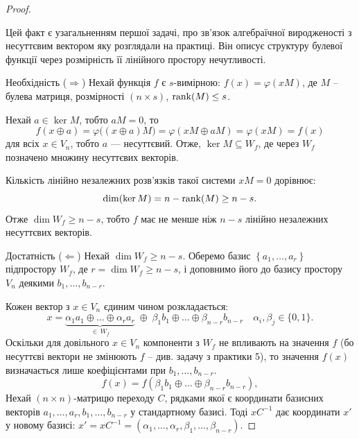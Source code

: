 \begin{proof}
    ~\par Цей факт є узагальненням першої задачі, про зв'язок алгебраїчної виродженості з несуттєвим вектором яку
    розглядали на практиці. Він описує структуру булевої функції через розмірність її лінійного простору нечутливості.

    Необхідність ($\Rightarrow$) Нехай функція $f$ є $s$-вимірною: $f(x) = \varphi(xM)$, де $M$ -- булева матриця,
    розмірності $(n \times s)$, $\operatorname{rank}(M) \leq s$.

    Нехай $a \in \ker M$, тобто $aM = 0$, то
    \begin{equation*}
        f(x \oplus a) = \varphi\big((x \oplus a)M\big) = \varphi(xM \oplus aM) = \varphi(xM) = f(x)
    \end{equation*}
    для всіх $x \in V_n$, тобто $a$ --- несуттєвий. Отже, $\ker M \subseteq W_{f}$, де через $W_{f}$ позначено
    множину несуттєвих векторів.

    \noindent Кількість лінійно незалежних розв'язків такої системи $xM = 0$ дорівнює:
    \begin{equation*}
        \dim(\ker M) = n - \operatorname{rank}(M) \geq n - s.
    \end{equation*}
    Отже $\dim W_f \geq n - s$, тобто $f$ має не менше ніж $n - s$ лінійно незалежних несуттєвих векторів.

    Достатність ($\Longleftarrow$) Нехай $\dim W_f \geq n - s$. Оберемо базис $\left\{a_1, \ldots, a_r\right\}$
    підпростору $W_f$, де $r = \dim W_f \geq n - s$, і доповнимо його до базису простору $V_n$ деякими $b_1, \ldots, b_{n-r}$.

    Кожен вектор з $x \in V_n$ єдиним чином розкладається:
    \begin{equation*}
        x = \underbrace{\alpha_1 a_1 \oplus \ldots \oplus \alpha_r a_r}_{\in\, W_f}
        \;\oplus\; \beta_1 b_1 \oplus \ldots \oplus \beta_{n-r} b_{n-r} \quad \alpha_i, \beta_j \in \{0,1\}.
    \end{equation*}
    Оскільки для довільного $x \in V_n$ компоненти з $W_f$ не впливають на значення $f$ (бо несуттєві вектори не змінюють
    $f$ -- див. задачу  з практики 5), то значення $f(x)$ визначається лише коефіцієнтами при $b_1, \ldots, b_{n-r}$.
    \begin{equation*}
        f(x) = f(\beta_1 b_1 \oplus \ldots \oplus \beta_{n-r} b_{n-r}),
    \end{equation*}
    Нехай $(n \times n)$-матрицю переходу $C$, рядками якої є координати базисних векторів 
    $a_1, \ldots, a_r, b_1, \ldots, b_{n-r}$ у стандартному базисі. Тоді $xC^{-1}$ дає координати $x'$ у новому 
    базисі: $x' = xC^{-1} = (\alpha_1, \ldots, \alpha_r, \beta_1, \ldots, \beta_{n-r})$.


\end{proof}
